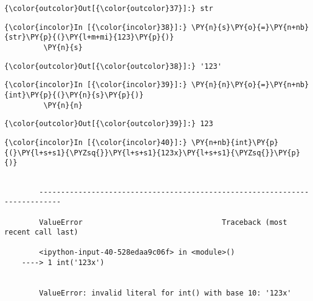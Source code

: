             \begin{Verbatim}[commandchars=\\\{\}]
{\color{outcolor}Out[{\color{outcolor}37}]:} str
\end{Verbatim}
        
    \begin{Verbatim}[commandchars=\\\{\}]
{\color{incolor}In [{\color{incolor}38}]:} \PY{n}{s}\PY{o}{=}\PY{n+nb}{str}\PY{p}{(}\PY{l+m+mi}{123}\PY{p}{)}
         \PY{n}{s}
\end{Verbatim}

            \begin{Verbatim}[commandchars=\\\{\}]
{\color{outcolor}Out[{\color{outcolor}38}]:} '123'
\end{Verbatim}
        
    \begin{Verbatim}[commandchars=\\\{\}]
{\color{incolor}In [{\color{incolor}39}]:} \PY{n}{n}\PY{o}{=}\PY{n+nb}{int}\PY{p}{(}\PY{n}{s}\PY{p}{)}
         \PY{n}{n}
\end{Verbatim}

            \begin{Verbatim}[commandchars=\\\{\}]
{\color{outcolor}Out[{\color{outcolor}39}]:} 123
\end{Verbatim}
        
    \begin{Verbatim}[commandchars=\\\{\}]
{\color{incolor}In [{\color{incolor}40}]:} \PY{n+nb}{int}\PY{p}{(}\PY{l+s+s1}{\PYZsq{}}\PY{l+s+s1}{123x}\PY{l+s+s1}{\PYZsq{}}\PY{p}{)}
\end{Verbatim}

    \begin{Verbatim}[commandchars=\\\{\}]

        ---------------------------------------------------------------------------

        ValueError                                Traceback (most recent call last)

        <ipython-input-40-528edaa9c06f> in <module>()
    ----> 1 int('123x')
    

        ValueError: invalid literal for int() with base 10: '123x'

    \end{Verbatim}

